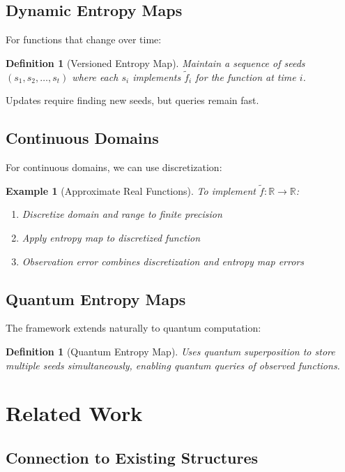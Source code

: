 \documentclass[11pt,final,hidelinks]{article}
\newtheorem{definition}[theorem]{Definition}
\newtheorem{example}[theorem]{Example}
\newcommand{\obs}[1]{\widetilde{#1}}  %
\begin{document}
\subsection{Dynamic Entropy Maps}

For functions that change over time:

\begin{definition}[Versioned Entropy Map]
Maintain a sequence of seeds $(s_1, s_2, \ldots, s_t)$ where each $s_i$ implements $\obs{f}_i$ for the function at time $i$.
\end{definition}

Updates require finding new seeds, but queries remain fast.

\subsection{Continuous Domains}

For continuous domains, we can use discretization:

\begin{example}[Approximate Real Functions]
To implement $\obs{f}: \mathbb{R} \to \mathbb{R}$:
\begin{enumerate}
    \item Discretize domain and range to finite precision
    \item Apply entropy map to discretized function
    \item Observation error combines discretization and entropy map errors
\end{enumerate}
\end{example}

\subsection{Quantum Entropy Maps}

The framework extends naturally to quantum computation:

\begin{definition}[Quantum Entropy Map]
Uses quantum superposition to store multiple seeds simultaneously, enabling quantum queries of observed functions.
\end{definition}

\section{Related Work}

\subsection{Connection to Existing Structures}
\end{document}

